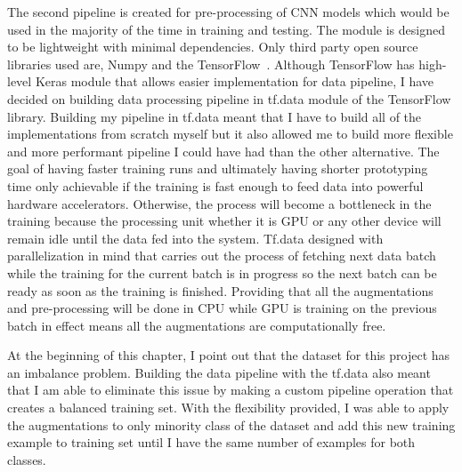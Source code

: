 The second pipeline is created for pre-processing of CNN models which would be used in the majority of the time in training and testing.
The module is designed to be lightweight with minimal dependencies. Only third party open source libraries used are, Numpy and the TensorFlow~\cite{tensorflow}.
Although TensorFlow has high-level Keras module that allows easier implementation for data pipeline, I have decided on building data processing pipeline in tf.data module of the TensorFlow library.
Building my pipeline in tf.data meant that I have to build all of the implementations from scratch myself but it also allowed me to build more flexible and more performant pipeline I could have had than the other alternative. 
The goal of having faster training runs and ultimately having shorter prototyping time only achievable if the training is fast enough to feed data into powerful hardware accelerators.
Otherwise, the process will become a bottleneck in the training because the processing unit whether it is GPU or any other device will remain idle until the data fed into the system.
Tf.data designed with parallelization in mind that carries out the process of fetching next data batch while the training for the current batch is in progress so the next batch can be ready as soon as the training is finished.
Providing that all the augmentations and pre-processing will be done in CPU while GPU is training on the previous batch in effect means all the augmentations are computationally free.


At the beginning of this chapter, I point out that the dataset for this project has an imbalance problem.
Building the data pipeline with the tf.data also meant that I am able to eliminate this issue by making a custom pipeline operation that creates a balanced training set.
With the flexibility provided, I was able to apply the augmentations to only minority class of the dataset and add this new training example to training set until I have the same number of examples for both classes.




\clearpage